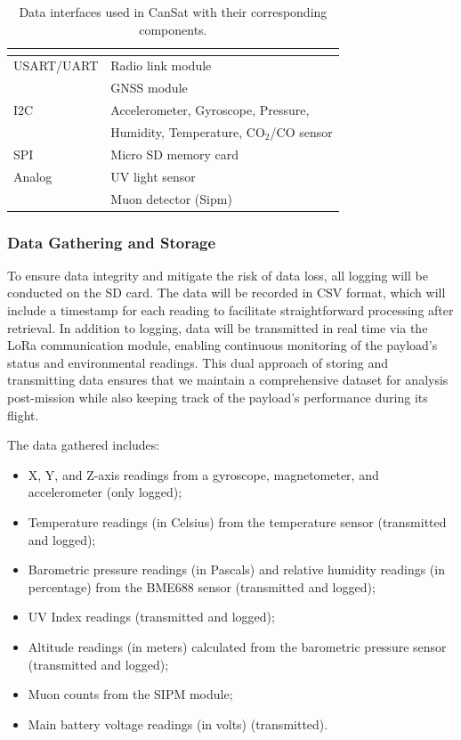 \begin{table}[ht]
\centering
{}
\begin{tabular}{ll}
\rowcolor{DeepSkyBlue4}
\hline
\textbf{\color{white!50}{Data Interface}} & \textbf{\color{white!50}{Components}} \\ \hline
USART/UART & Radio link module \\
& GNSS module \\ 
\rowcolor{LightCyan1!50}I2C & Accelerometer, Gyroscope, Pressure, \\
\rowcolor{LightCyan1!50} &Humidity, Temperature, CO$_2$/CO sensor \\
SPI & Micro SD memory card \\ 
\rowcolor{LightCyan1!50}Analog & UV light sensor \\
\rowcolor{LightCyan1!50} & Muon detector (Sipm) \\
\hline
\end{tabular}
\caption{\small{Data interfaces used in CanSat with their corresponding components.}}
\label{tab:data-interfaces}
\end{table}

\subsubsection{Data Gathering and Storage}

To ensure data integrity and mitigate the risk of data loss, all logging will be conducted on the SD card. The data will be recorded in CSV format, which will include a timestamp for each reading to facilitate straightforward processing after retrieval. In addition to logging, data will be transmitted in real time via the LoRa communication module, enabling continuous monitoring of the payload's status and environmental readings. This dual approach of storing and transmitting data ensures that we maintain a comprehensive dataset for analysis post-mission while also keeping track of the payload's performance during its flight.

The data gathered includes:
\begin{itemize}
\item X, Y, and Z-axis readings from a gyroscope, magnetometer, and accelerometer (only logged);
\item Temperature readings (in Celsius) from the temperature sensor (transmitted and logged);
\item Barometric pressure readings (in Pascals) and relative humidity readings (in percentage) from the BME688 sensor (transmitted and logged);
\item UV Index readings (transmitted and logged);
\item Altitude readings (in meters) calculated from the barometric pressure sensor (transmitted and logged);
\item Muon counts from the SIPM module;
\item Main battery voltage readings (in volts) (transmitted).
\end{itemize}

